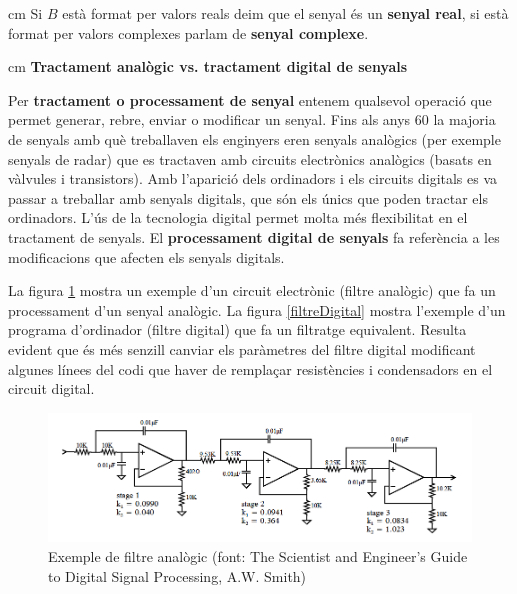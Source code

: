 \documentclass{article}
\begin{document}
 cm
\noindent
Si $B$ est\`a format per valors reals deim que el senyal \'es un \textbf{senyal real},
si est\`a format per valors complexes parlam de \textbf{senyal complexe}.


 cm
\noindent
\textbf{Tractament analògic vs. tractament digital de senyals}

Per \textbf{tractament o processament de senyal} entenem qualsevol operaci\'o que permet generar, rebre,
enviar o modificar un senyal. Fins als anys 60 la majoria de senyals amb qu\`e treballaven els enginyers eren 
senyals anal\`ogics (per exemple senyals de radar) que es tractaven amb circuits electr\`onics anal\`ogics 
(basats en v\`alvules i transistors). Amb l'aparici\'o dels ordinadors i els circuits digitals es va passar 
a treballar amb senyals digitals, que s\'on els \'unics que poden tractar els ordinadors.
L'\'us de la tecnologia digital permet molta m\'es flexibilitat en el tractament de senyals.
El \textbf{processament digital de senyals} fa refer\`encia a les modificacions que afecten els senyals digitals.

La figura \ref{filtreAnalogic} mostra un exemple d'un circuit electrònic (filtre analògic) que fa un processament d'un
senyal analògic. La figura \ref{filtreDigital} mostra l'exemple d'un programa d'ordinador (filtre digital) que fa
un filtratge equivalent. Resulta evident que és més senzill canviar els paràmetres del filtre digital modificant algunes
línees del codi que haver de remplaçar resistències i condensadors en el circuit digital.

\begin{figure}[htbp]
\centering
\includegraphics[width=14cm]{filtreanalogic.png} 
\caption{Exemple de filtre analògic (font: The Scientist and Engineer's Guide to Digital Signal Processing, A.W. Smith)}
\label{filtreAnalogic}
\end{figure}
\end{document}
